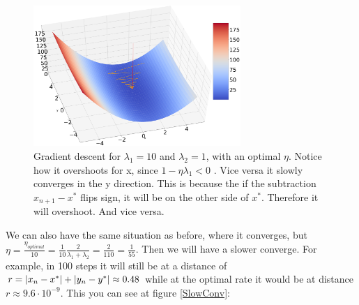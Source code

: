 \documentclass[a4paper]{article}
\begin{document}
\begin{figure}[H]
\includegraphics[width=0.7\textwidth]{Images/ConvMany.png}
\caption{Gradient descent for $\lambda_1 = 10$ and $\lambda_2 = 1$, with an optimal $\eta$. Notice how it overshoots for x, since $1-\eta\lambda_1 < 0$ . Vice versa it slowly converges in the y direction. This is because the if the subtraction $x_{n+1} - x^*$ flips sign, it will be on the other side of $x^*$. Therefore it will overshoot. And vice versa.}
\end{figure}

\newpage

We can also have the same situation as before, where it converges, but $\eta = \frac{\eta_{optimal}}{10} = \frac{1}{10} \frac{2}{\lambda_1+\lambda_2} = \frac{2}{110} = \frac{1}{55}$. Then we will have a slower converge. For example, in 100 steps it will still be at a distance of $r = \abs{x_n - x^*} + \abs{y_n - y^*} \approx 0.48$ while at the optimal rate it would be at distance $r \approx 9.6\cdot 10^{-9}$. This you can see at figure \ref{SlowConv}:
\end{document}
